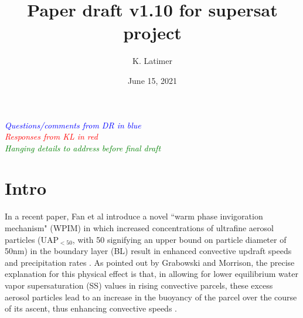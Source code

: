 \documentclass{article}
\title{Paper draft v1.10 for supersat project}
\author{K. Latimer}
\date{June 15, 2021}
\newcommand{\drcomm}[1]{\textcolor{blue}{\textit{#1}}}
\newcommand{\klcomm}[1]{\textcolor{red}{\textit{#1}}}
\newcommand{\todo}[1]{\textcolor{green}{\textit{#1}}}
\begin{document}
\maketitle

\noindent\drcomm{Questions/comments from DR in blue} \\
\noindent\klcomm{Responses from KL in red}\\
\noindent\todo{Hanging details to address before final draft}\\

\section{Intro}

In a recent paper, Fan et al introduce a novel ``warm phase invigoration mechanism" (WPIM) in which increased concentrations of ultrafine aerosol particles (UAP$_{<50}$, with 50 signifying an upper bound on particle diameter of 50nm) in the boundary layer (BL) result in enhanced convective updraft speeds and precipitation rates \cite{Fan2018}. As pointed out by Grabowski and Morrison, the precise explanation for this physical effect is that, in allowing for lower equilibrium water vapor supersaturation (SS) values in rising convective parcels, these excess aerosol particles lead to an increase in the buoyancy of the parcel over the course of its ascent, thus enhancing convective speeds \cite{Grabowski2020}.
\end{document}
